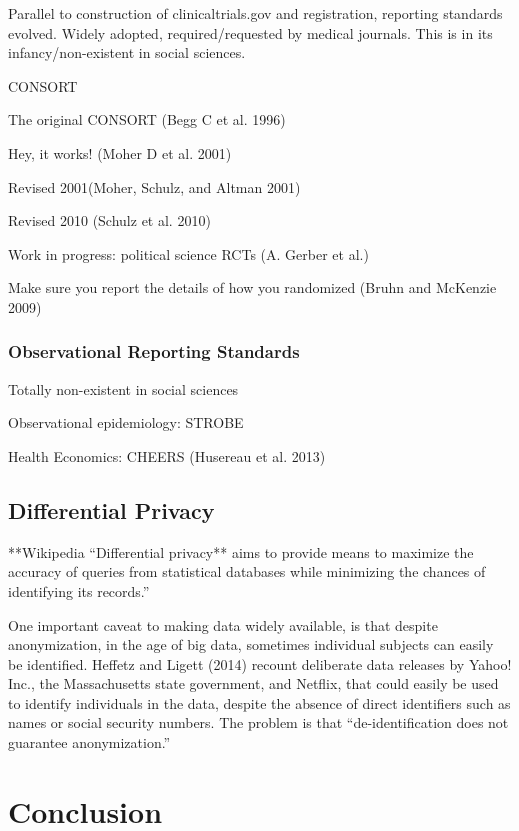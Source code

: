 \documentclass[12pt] {article}
\begin{document}
Parallel to construction of clinicaltrials.gov and registration,
reporting standards evolved. Widely adopted, required/requested by
medical journals. This is in its infancy/non-existent in social
sciences.

CONSORT

The original CONSORT (Begg C et al. 1996)

Hey, it works! (Moher D et al. 2001)

Revised 2001(Moher, Schulz, and Altman 2001)

Revised 2010 (Schulz et al. 2010)

Work in progress: political science RCTs (A. Gerber et al.)

Make sure you report the details of how you randomized (Bruhn and
McKenzie 2009)

\subsubsection{Observational Reporting
Standards}\label{observational-reporting-standards}

Totally non-existent in social sciences

Observational epidemiology: STROBE

Health Economics: CHEERS (Husereau et al. 2013)

\subsection{Differential Privacy}\label{differential-privacy}

**Wikipedia ``Differential privacy** aims to provide means to maximize
the accuracy of queries from statistical databases while minimizing the
chances of identifying its records.''

One important caveat to making data widely available, is that despite
anonymization, in the age of big data, sometimes individual subjects can
easily be identified. Heffetz and Ligett (2014) recount deliberate data
releases by Yahoo! Inc., the Massachusetts state government, and
Netflix, that could easily be used to identify individuals in the data,
despite the absence of direct identifiers such as names or social
security numbers. The problem is that ``de-identification does not
guarantee anonymization.''

\section{Conclusion}\label{conclusion}
\end{document}
